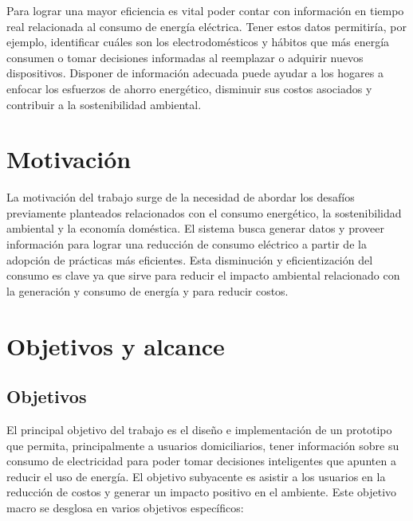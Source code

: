Para lograr una mayor eficiencia es vital poder contar con información en tiempo real relacionada al consumo de energía eléctrica. Tener estos datos permitiría, por ejemplo, identificar cuáles son los electrodomésticos y hábitos que más energía consumen o tomar decisiones informadas al reemplazar o adquirir nuevos dispositivos. Disponer de información adecuada puede ayudar a los hogares a enfocar los esfuerzos de ahorro energético, disminuir sus costos asociados y contribuir a la sostenibilidad ambiental.

\newpage
\section{Motivación}
La motivación del trabajo surge de la necesidad de abordar los desafíos previamente planteados relacionados con el consumo energético, la sostenibilidad ambiental y la economía doméstica. El sistema busca generar datos y proveer información para lograr una reducción de consumo eléctrico a partir de la adopción de prácticas más eficientes. Esta disminución y eficientización del consumo es clave ya que sirve para reducir el impacto ambiental relacionado con la generación y consumo de energía y para reducir costos.

\section{Objetivos y alcance}

\subsection{Objetivos}
El principal objetivo del trabajo es el diseño e implementación de un prototipo que permita, principalmente a usuarios domiciliarios, tener información sobre su consumo de electricidad para poder tomar decisiones inteligentes que apunten a reducir el uso de energía. El objetivo subyacente es asistir a los usuarios en la reducción de costos y generar un impacto positivo en el ambiente. Este objetivo macro se desglosa en varios objetivos específicos:

